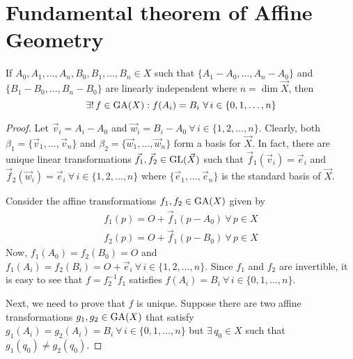 \section{Fundamental theorem of Affine Geometry}

\begin{theorem}
    If $A_0,A_1,\dots,A_n,B_0,B_1,\dots,B_n \in X$ such that
    $\{A_1-A_0,\dots,A_n-A_0\}$ and $\{B_1-B_0,\dots,B_n-B_0\}$ are linearly
    independent where $n = \dim \vec{X}$, then
    \[ \exists!\,f\in\GA(X): f(A_i) = B_i\ \forall\,i\in\{0,1,\dots,n\} \]
\end{theorem}

\begin{proof}
    Let $\vec{v}_i=A_i-A_0$ and $\vec{w}_i=B_i-A_0\ \forall\,i\in\{1,2,\dots,n\}$.
    Clearly, both $\beta_1=\{\vec{v}_1,\dots,\vec{v}_n\}$ and
    $\beta_2=\{\vec{w}_1,\dots,\vec{w}_n\}$ form a basis for $\vec{X}$. In fact,
    there are unique linear transformations $\vec{f}_1,\vec{f}_2\in\operatorname{GL}(\vec{X})$
    such that $\vec{f}_1(\vec{v}_i)=\vec{e}_i$ and
    $\vec{f}_2(\vec{w}_i)=\vec{e}_i\ \forall\,i\in\{1,2,\dots,n\}$ where
    $\{\vec{e}_1,\dots,\vec{e}_n\}$ is the standard basis of $\vec{X}$.
    \vspace{1ex}

    \noindent
    Consider the affine transformations $f_1,f_2\in\operatorname{GA}(X)$ given by
    \begin{align*}
        f_1(p) = O + \vec{f}_1(p-A_0)\ \forall\,p \in X \\
        f_2(p) = O + \vec{f}_1(p-B_0)\ \forall\,p \in X 
    \end{align*}
    Now, $f_1(A_0)=f_2(B_0)=O$ and
    $f_1(A_i)=f_2(B_i)=O+\vec{e}_i\ \forall\,i\in\{1,2,\dots,n\}$. Since $f_1$ and
    $f_2$ are invertible, it is easy to see that $f=f_2^{-1}f_1$ satisfies
    $f(A_i)=B_i\ \forall\,i\in\{0,1,\dots,n\}$.
    \vspace{1ex}

    \noindent
    Next, we need to prove that $f$ is unique. Suppose there are two affine
    transformations $g_1,g_2\in\operatorname{GA}(X)$ that satisfy
    $g_1(A_i)=g_2(A_i)=B_i\ \forall\,i\in\{0,1,\dots,n\}$ but $\exists\,q_0 \in X$
    such that $g_1(q_0) \neq g_2(q_0)$.
    \vspace{1ex}


\end{proof}
